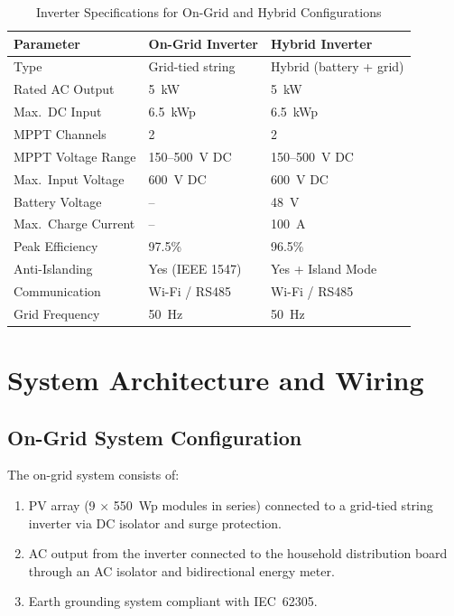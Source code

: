 \begin{table}[H]
\centering
\caption{Inverter Specifications for On-Grid and Hybrid Configurations}
\label{tab:inverter_specs}
\begin{tabular}{@{}p{4.5cm} p{4cm} p{4cm}@{}}
\toprule
\textbf{Parameter} & \textbf{On-Grid Inverter} & \textbf{Hybrid Inverter} \\
\midrule
Type & Grid-tied string & Hybrid (battery + grid) \\
Rated AC Output & 5~kW & 5~kW \\
Max.\ DC Input & 6.5~kWp & 6.5~kWp \\
MPPT Channels & 2 & 2 \\
MPPT Voltage Range & 150--500~V DC & 150--500~V DC \\
Max.\ Input Voltage & 600~V DC & 600~V DC \\
Battery Voltage & -- & 48~V \\
Max.\ Charge Current & -- & 100~A \\
Peak Efficiency & 97.5\% & 96.5\% \\
Anti-Islanding & Yes (IEEE 1547) & Yes + Island Mode \\
Communication & Wi-Fi / RS485 & Wi-Fi / RS485 \\
Grid Frequency & 50~Hz & 50~Hz \\
\bottomrule
\end{tabular}
\end{table}


\section{System Architecture and Wiring}

\subsection{On-Grid System Configuration}

The on-grid system consists of:

\begin{enumerate}
    \item PV array (9 $\times$ 550~Wp modules in series) connected to a grid-tied string inverter via DC isolator and surge protection.
    \item AC output from the inverter connected to the household distribution board through an AC isolator and bidirectional energy meter.
    \item Earth grounding system compliant with IEC~62305.
\end{enumerate}


